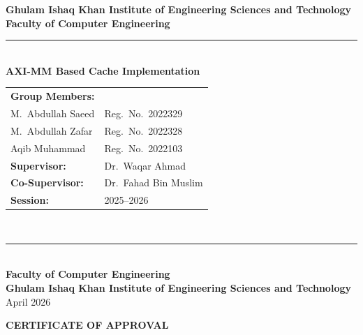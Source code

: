 \documentclass[12pt,letterpaper]{report}
\begin{document}
\begin{titlepage}
\pagestyle{empty}
\centering
\vspace*{0pt}

\vspace{0.6cm}
{\fontsize{14}{17}\selectfont\bfseries
  Ghulam Ishaq Khan Institute of Engineering Sciences and Technology}\\[0.25cm]
{\fontsize{14}{17}\selectfont\bfseries Faculty of Computer Engineering}\\[0.2cm]
{\color{giki}\rule{\linewidth}{1pt}}\\[1.2cm]

{\fontsize{18}{22}\selectfont\bfseries
  AXI-MM Based Cache Implementation}\\[1.4cm]

{\fontsize{14}{18}\selectfont\bfseries
\begin{tabular}{@{}ll@{}}
  \textbf{Group Members:} & \\[4pt]
  M.\ Abdullah Saeed  & Reg.\ No.\ 2022329 \\[4pt]
  M.\ Abdullah Zafar  & Reg.\ No.\ 2022328 \\[4pt]
  Aqib Muhammad       & Reg.\ No.\ 2022103 \\[10pt]
  \textbf{Supervisor:}    & Dr.\ Waqar Ahmad       \\[4pt]
  \textbf{Co-Supervisor:} & Dr.\ Fahad Bin Muslim  \\[4pt]
  \textbf{Session:}   & 2025--2026         \\
\end{tabular}}\\[1.4cm]

{\color{giki}\rule{\linewidth}{1pt}}\\[0.5cm]
{\fontsize{14}{17}\selectfont\bfseries
  Faculty of Computer Engineering}\\[0.2cm]
{\fontsize{14}{17}\selectfont\bfseries
  Ghulam Ishaq Khan Institute of Engineering Sciences and Technology}\\[0.3cm]
{\large April 2026}
\end{titlepage}
\restoregeometry

\clearpage
\pagestyle{empty}
\begin{center}
{\fontsize{14}{17}\selectfont\bfseries CERTIFICATE OF APPROVAL}
\end{center}
\vspace{18pt}
\end{document}
